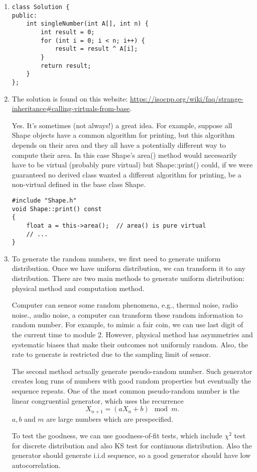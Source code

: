 \documentclass[10pt, onecolumn, draftcls]{IEEEtran}
\begin{document}
\begin{enumerate}
\item
\begin{lstlisting}
class Solution {
public:
    int singleNumber(int A[], int n) {
        int result = 0;
        for (int i = 0; i < n; i++) {
            result = result ^ A[i];
        }
        return result;
    }
};\end{lstlisting}

\item
The solution is found on this website: \url{https://isocpp.org/wiki/faq/strange-inheritance#calling-virtuals-from-base}.

Yes. It’s sometimes (not always!) a great idea. For example, suppose all Shape objects have a common algorithm for printing, but this algorithm depends on their area and they all have a potentially different way to compute their area. In this case Shape’s area() method would necessarily have to be virtual (probably pure virtual) but Shape::print() could, if we were guaranteed no derived class wanted a different algorithm for printing, be a non-virtual defined in the base class Shape.
\begin{lstlisting}
#include "Shape.h"
void Shape::print() const
{
    float a = this->area();  // area() is pure virtual
    // ...
}
\end{lstlisting}

\item
To generate the random numbers, we first need to generate uniform distribution. Once we have uniform distribution, we can transform it to any distribution. There are two main methods to generate uniform distribution: physical method and computation method. 

Computer can sensor some random phenomena, e.g., thermal noise, radio noise., audio noise, a computer can transform these random information to random number. For example, to mimic a fair coin, we can use last digit of the current time to module 2. However, physical method has asymmetries and systematic biases that make their outcomes not uniformly random. Also, the rate to generate is restricted due to the sampling limit of sensor. 

The second method actually generate pseudo-random number. Such generator creates long runs of numbers with good random properties but eventually the sequence repeats. One of the most common pseudo-random number is the linear congruential generator, which uses the recurrence
$$X_{n+1}=(aX_n+b)\mod m.$$
$a,b$ and $m$ are large numbers which are prespecified.

To test the goodness, we can use goodness-of-fit tests, which include $\chi^2$ test for discrete distribution and also KS test for continuous distribution. Also the generator should generate i.i.d sequence, so a good generator should have low autocorrelation.


\end{enumerate}
\end{document}
